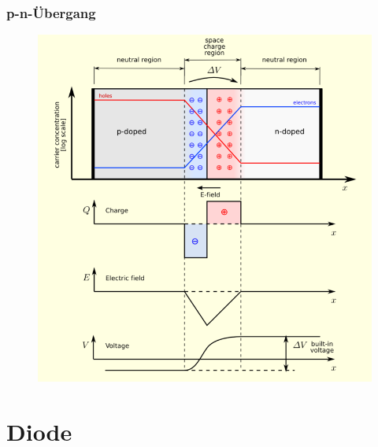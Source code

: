 \begin{frame}
  \frametitle{p-n-Übergang}
  \begin{center}
    \begin{figure}
      \includegraphics[height=.75\textheight,width=\textwidth,keepaspectratio]{e12/pn-Diagram.png}
    \end{figure}
  \end{center}
\end{frame}

\section*{Diode}

